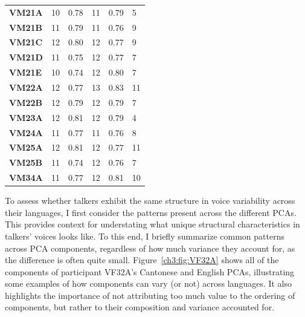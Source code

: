 \begin{table}[htbp]
{\begin{tabular}{llllll}
    \textbf{VM21A} & 10 & 0.78 & 11 & 0.79 & 5 \\
    \textbf{VM21B} & 11 & 0.79 & 11 & 0.76 & 9 \\
    \textbf{VM21C} & 12 & 0.80 & 12 & 0.77 & 9 \\
    \textbf{VM21D} & 11 & 0.75 & 12 & 0.77 & 7 \\
    \textbf{VM21E} & 10 & 0.74 & 12 & 0.80 & 7 \\
    \textbf{VM22A} & 12 & 0.77 & 13 & 0.83 & 11 \\
    \textbf{VM22B} & 12 & 0.79 & 12 & 0.79 & 7 \\
    \textbf{VM23A} & 12 & 0.81 & 12 & 0.79 & 4 \\
    \textbf{VM24A} & 11 & 0.77 & 11 & 0.76 & 8 \\
    \textbf{VM25A} & 12 & 0.81 & 12 & 0.77 & 11 \\
    \textbf{VM25B} & 11 & 0.74 & 12 & 0.76 & 7 \\
    \textbf{VM34A} & 11 & 0.77 & 12 & 0.81 & 10 \\
    \bottomrule
    \end{tabular}
}
\end{table}

To assess whether talkers exhibit the same structure in voice variability across their languages, I first consider the patterns present across the different PCAs. This provides context for understating what unique structural characteristics in talkers' voices looks like. To this end, I briefly summarize common patterns across PCA components, regardless of how much variance they account for, as the difference is often quite small. Figure~\ref{ch3:fig:VF32A} shows all of the components of participant VF32A's Cantonese and English PCAs, illustrating some examples of how components can vary (or not) across languages. It also highlights the importance of not attributing too much value to the ordering of components, but rather to their composition and variance accounted for.

